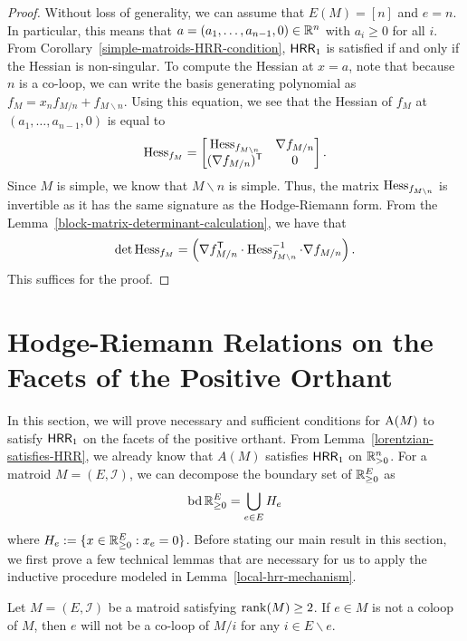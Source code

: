 \documentclass{puthesis-UG}
\begin{document}
\begin{proof}
	Without loss of generality, we can assume that $E(M) = [n]$ and $e = n$. In particular, this means that $a = (a_1, \ldots, a_{n-1}, 0) \in \mathbb{R}^n$ with $a_i \geq 0$ for all $i$. From Corollary~\ref{simple-matroids-HRR-condition}, $\mathsf{HRR}_1$ is satisfied if and only if the Hessian is non-singular. To compute the Hessian at $x = a$, note that because $n$ is a co-loop, we can write the basis generating polynomial as $f_M = x_n f_{M / n} + f_{M \backslash n}$. Using this equation, we see that the Hessian of $f_M$ at $(a_1, \ldots, a_{n-1}, 0)$ is equal to 
	\[
		\operatorname{Hess}_{f_M} = \begin{bmatrix}
			\operatorname{Hess}_{f_{M \backslash n}} & \nabla f_{M/n} \\
			(\nabla f_{M/n})^{\mathsf{T}} & 0
		\end{bmatrix}.
	\]
	Since $M$ is simple, we know that $M \backslash n$ is simple. Thus, the matrix $\operatorname{Hess}_{f_{M \backslash n}}$ is invertible as it has the same signature as the Hodge-Riemann form. From the Lemma~\ref{block-matrix-determinant-calculation}, we have that
	\[
		\det \operatorname{Hess}_{f_M} = \left ( \nabla f_{M / n}^{\mathsf{T}} \cdot \operatorname{Hess}^{-1}_{f_{M \backslash n}} \cdot \nabla f_{M / n} \right ).
	\]
	This suffices for the proof. 
\end{proof}

\section{Hodge-Riemann Relations on the Facets of the Positive Orthant} \label{sec:HRR-on-facets}

In this section, we will prove necessary and sufficient conditions for $\operatorname{A}(M)$ to satisfy $\mathsf{HRR}_1$ on the facets of the positive orthant. From Lemma~\ref{lorentzian-satisfies-HRR}, we already know that $A(M)$ satisfies $\mathsf{HRR}_1$ on $\mathbb{R}_{> 0}^n$. For a matroid $M = (E, \mathcal{I})$, we can decompose the boundary set of $\mathbb{R}^{E}_{\geq 0}$ as
\[	
	\operatorname{bd} \mathbb{R}_{\geq 0}^E = \bigcup_{e \in E} H_e
\]
where $H_e := \{x \in \mathbb{R}_{\geq 0}^E : x_e = 0 \}$. Before stating our main result in this section, we first prove a few technical lemmas that are necessary for us to apply the inductive procedure modeled in Lemma~\ref{local-hrr-mechanism}. 

\begin{lem} \label{contracting-stays-not-a-coloop}
	Let $M = (E, \mathcal{I})$ be a matroid satisfying $\operatorname{rank} (M) \geq 2$. If $e \in M$ is not a coloop of $M$, then $e$ will not be a co-loop of $M / i$ for any $i \in E \backslash e$. 
\end{lem}
\end{document}
